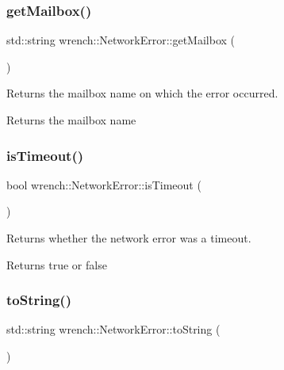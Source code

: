\subsubsection{\texorpdfstring{get\+Mailbox()}{getMailbox()}}
{\footnotesize\ttfamily std\+::string wrench\+::\+Network\+Error\+::get\+Mailbox (\begin{DoxyParamCaption}{ }\end{DoxyParamCaption})}



Returns the mailbox name on which the error occurred. 

\begin{DoxyReturn}{Returns}
the mailbox name 
\end{DoxyReturn}
\mbox{\label{classwrench_1_1_network_error_a4aed0a6b6496e19e70e16da31eae8b19}} 
\subsubsection{\texorpdfstring{is\+Timeout()}{isTimeout()}}
{\footnotesize\ttfamily bool wrench\+::\+Network\+Error\+::is\+Timeout (\begin{DoxyParamCaption}{ }\end{DoxyParamCaption})}



Returns whether the network error was a timeout. 

\begin{DoxyReturn}{Returns}
true or false 
\end{DoxyReturn}
\mbox{\label{classwrench_1_1_network_error_a114346c3faa84b3925600e9a22314a37}} 
\subsubsection{\texorpdfstring{to\+String()}{toString()}}
{\footnotesize\ttfamily std\+::string wrench\+::\+Network\+Error\+::to\+String (\begin{DoxyParamCaption}{ }\end{DoxyParamCaption})\hspace{0.3cm}{\ttfamily [virtual]}}



